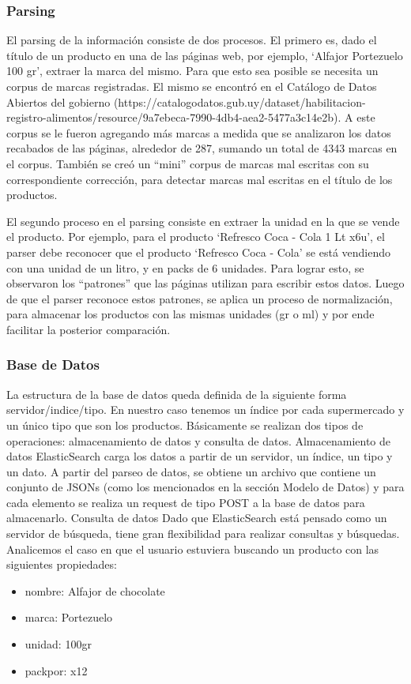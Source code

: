 \documentclass[12pt]{article} %
\begin{document}
\subsubsection{Parsing}

El parsing de la información consiste de dos procesos. El primero es, dado el título de un producto en una de las páginas web, por ejemplo, ‘Alfajor Portezuelo 100 gr’, extraer la marca del mismo. Para que esto sea posible se necesita un corpus de marcas registradas. El mismo se encontró en el Catálogo de Datos Abiertos del gobierno (https://catalogodatos.gub.uy/dataset/habilitacion-registro-alimentos/resource/9a7ebeca-7990-4db4-aea2-5477a3c14e2b). A este corpus se le fueron agregando más marcas a medida que se analizaron los datos recabados de las páginas, alrededor de 287, sumando un total de 4343 marcas en el corpus. También se creó un “mini” corpus de marcas mal escritas con su correspondiente corrección, para detectar marcas mal escritas en el título de los productos.

El segundo proceso en el parsing consiste en extraer la unidad en la que se vende el producto. Por ejemplo, para el producto ‘Refresco Coca - Cola 1 Lt x6u’, el parser debe reconocer que el producto ‘Refresco Coca - Cola’ se está vendiendo con una unidad de un litro, y en packs de 6 unidades. Para lograr esto, se observaron los “patrones” que las páginas utilizan para escribir estos datos. Luego de que el parser reconoce estos patrones, se aplica un proceso de normalización, para almacenar los productos con las mismas unidades (gr o ml) y por ende facilitar la posterior comparación.

\subsubsection{Base de Datos}
La estructura de la base de datos queda definida de la siguiente forma servidor/indice/tipo. En nuestro caso tenemos un índice por cada supermercado y un único tipo que son los productos. 
Básicamente se realizan dos tipos de operaciones: almacenamiento de datos y consulta de datos. 
Almacenamiento de datos
ElasticSearch carga los datos a partir de un servidor, un índice, un tipo y un dato. 
A partir del parseo de datos, se obtiene un archivo que contiene un conjunto de JSONs (como los mencionados en la sección Modelo de Datos) y para cada elemento se realiza un request de tipo POST a la base de datos para almacenarlo.
Consulta de datos
Dado que ElasticSearch está pensado como un servidor de búsqueda, tiene gran flexibilidad para realizar consultas y búsquedas. Analicemos el caso en que el usuario estuviera buscando un producto con las siguientes propiedades:
\begin{itemize}
	\item nombre: Alfajor de chocolate
	\item marca: Portezuelo
	\item unidad: 100gr
	\item packpor: x12
\end{itemize}
\end{document}
